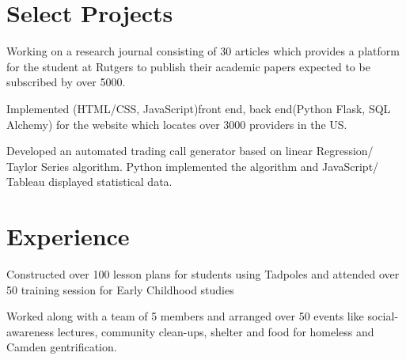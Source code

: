 \documentclass[]{deedy-resume-openfont}
\begin{document}
\hfill
\begin{minipage}[t]{0.66\textwidth} 


\section{Select Projects}
\textbullet{} Working on a research journal consisting of 30 articles which provides a platform for the student at Rutgers to publish their academic papers expected to be subscribed by over 5000. \textbf
\sectionsep

\item 
\textbullet{}Implemented  (HTML/CSS, JavaScript)front end, back end(Python Flask, SQL Alchemy) for the website which locates over 3000 providers in the US.\textbf
\sectionsep

\textbullet{} Developed an automated trading call generator based on linear Regression/ Taylor Series algorithm.
\textbullet{} Python implemented the algorithm and JavaScript/ Tableau displayed statistical data.  \textbf
\sectionsep



\section{Experience}

\begin{tightemize}\item Constructed over 100 lesson plans for students using Tadpoles and attended over 50 training session for Early Childhood studies
\end{tightemize}
\sectionsep

\begin{tightemize}
\item Worked along with a team of 5 members and arranged over 50 events like social-awareness lectures, community clean-ups, shelter and food for homeless and Camden gentrification.\end{tightemize}
\sectionsep


\end{minipage}
\end{document}

